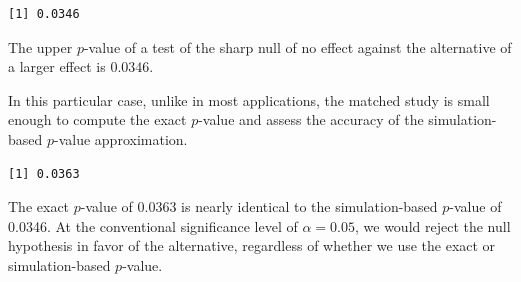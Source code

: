 \documentclass[
  12pt,
  leqno]{article}
\newenvironment{Shaded}{\begin{snugshade}}{\end{snugshade}}
\newcommand{\AttributeTok}[1]{\textcolor[rgb]{0.13,0.29,0.53}{#1}}
\newcommand{\CommentTok}[1]{\textcolor[rgb]{0.56,0.35,0.01}{\textit{#1}}}
\newcommand{\DecValTok}[1]{\textcolor[rgb]{0.00,0.00,0.81}{#1}}
\newcommand{\FunctionTok}[1]{\textcolor[rgb]{0.13,0.29,0.53}{\textbf{#1}}}
\newcommand{\NormalTok}[1]{#1}
\newcommand{\OtherTok}[1]{\textcolor[rgb]{0.56,0.35,0.01}{#1}}
\newcommand{\SpecialCharTok}[1]{\textcolor[rgb]{0.81,0.36,0.00}{\textbf{#1}}}
\begin{document}
\begin{verbatim}
[1] 0.0346
\end{verbatim}

\doublespacing

The upper \(p\)-value of a test of the sharp null of no effect against
the alternative of a larger effect is \(0.0346\).

In this particular case, unlike in most applications, the matched study
is small enough to compute the exact \(p\)-value and assess the accuracy
of the simulation-based \(p\)-value approximation.

\singlespacing

\begin{Shaded}
\end{Shaded}

\begin{verbatim}
[1] 0.0363
\end{verbatim}

\doublespacing

The exact \(p\)-value of 0.0363 is nearly identical to the
simulation-based \(p\)-value of 0.0346. At the conventional significance
level of \(\alpha = 0.05\), we would reject the null hypothesis in favor
of the alternative, regardless of whether we use the exact or
simulation-based \(p\)-value.
\end{document}

